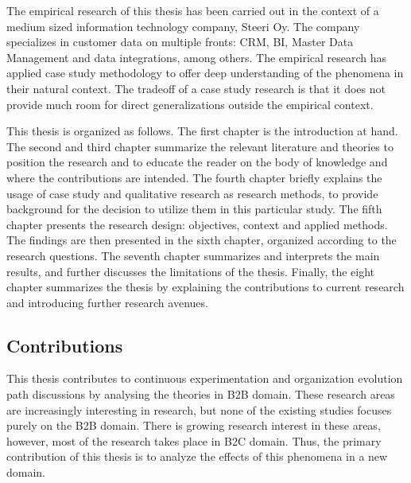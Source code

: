 \documentclass[english]{tktltiki2}
\theoremstyle{definition}
\theoremstyle{remark}
\begin{document}
The empirical research of this thesis has been carried out in the context of a medium sized information technology company, Steeri Oy. The company specializes in customer data on multiple fronts: CRM, BI, Master Data Management and data integrations, among others. The empirical research has applied case study methodology to offer deep understanding of the phenomena in their natural context. The tradeoff of a case study research is that it does not provide much room for direct generalizations outside the empirical context. 

This thesis is organized as follows. The first chapter is the introduction at hand. The second and third chapter summarize the relevant literature and theories to position the research and to educate the reader on the body of knowledge and where the contributions are intended. The fourth chapter briefly explains the usage of case study and qualitative research as research methods, to provide background for the decision to utilize them in this particular study. The fifth chapter presents the research design: objectives, context and applied methods. The findings are then presented in the sixth chapter, organized according to the research questions. The seventh chapter summarizes and interprets the main results, and further discusses the limitations of the thesis. Finally, the eight chapter summarizes the thesis by explaining the contributions to current research and introducing further research avenues.
%

\subsection{Contributions}
This thesis contributes to continuous experimentation \cite{fagerholm2014building} and organization evolution path \cite{olsson2012climbing} discussions by analysing the theories in B2B domain. These research areas are increasingly interesting in research, but none of the existing studies focuses purely on the B2B domain. There is growing research interest in these areas, however, most of the research takes place in B2C domain. Thus, the primary contribution of this thesis is to analyze the effects of this phenomena in a new domain. 
\end{document}
